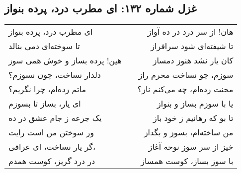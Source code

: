 \begin{center}
\section*{غزل شماره ۱۳۲: ای مطرب درد، پرده بنواز}
\label{sec:132}
\begin{longtable}{l p{0.5cm} r}
ای مطرب درد، پرده بنواز
&&
هان! از سر درد در ده آواز
\\
تا سوخته‌ای دمی بنالد
&&
تا شیفته‌ای شود سرافراز
\\
هین! پرده بساز و خوش همی سوز
&&
کان یار نشد هنوز دمساز
\\
دلدار نساخت، چون نسوزم؟
&&
سوزم، چو نساخت محرم راز
\\
ماتم زده‌ام، چرا نگریم؟
&&
محنت زده‌ام، چه می‌کنم ناز؟
\\
ای یار، بساز تا بسوزم
&&
یا با سوزم بساز و بنواز
\\
یک جرعه ز جام عشق در ده
&&
تا بو که رهانیم ز خود باز
\\
ور سوختن من است رایت
&&
من ساخته‌ام، بسوز و بگداز
\\
گر یار نساخت، ای عراقی،
&&
خیز از سر سوز نوحه آغاز
\\
در درد گریز، کوست همدم
&&
با سوز بساز، کوست همساز
\\
\end{longtable}
\end{center}
